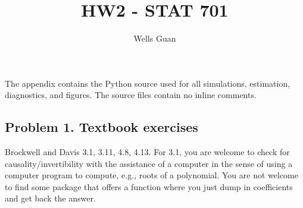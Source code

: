 \documentclass[lang=en,11pt,a4paper,citestyle =authoryear]{elegantpaper}
\title{HW2 - STAT 701}
\author{Wells Guan}
\begin{document}
\maketitle

\noindent The appendix contains the Python source used for all simulations,
estimation, diagnostics, and figures. The source files contain no inline
comments.

\subsection*{Problem 1. Textbook exercises}
Brockwell and Davis 3.1, 3.11, 4.8, 4.13. For 3.1, you are welcome to check for causality/invertibility with the assistance of a computer in the sense of using a computer program to compute, e.g., roots of a polynomial. You are not welcome to find some package that offers a function where you just dump in coefficients and get back the answer.
\end{document}
